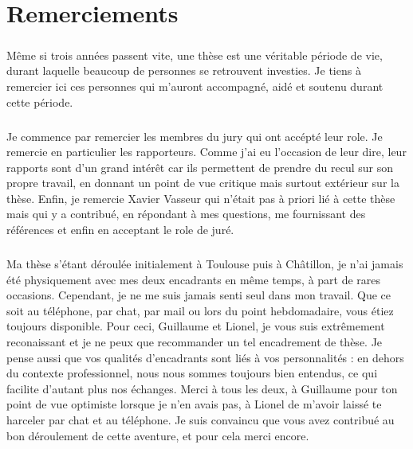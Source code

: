 \chapter{Remerciements}

  \paragraph{}
  Même si trois années passent vite, une thèse est une véritable période de vie, durant laquelle beaucoup de personnes se retrouvent investies.
  Je tiens à remercier ici ces personnes qui m'auront accompagné, aidé et soutenu durant cette période.

  \paragraph{}
  Je commence par remercier les membres du jury qui ont accépté leur role.
  Je remercie en particulier les rapporteurs.
  Comme j'ai eu l'occasion de leur dire, leur rapports sont d'un grand intérêt car ils permettent de prendre du recul sur son propre travail, en donnant un point de vue critique mais surtout extérieur sur la thèse.
  Enfin, je remercie Xavier Vasseur qui n'était pas à priori lié à cette thèse mais qui y a contribué, en répondant à mes questions, me fournissant des références et enfin en acceptant le role de juré.

  \paragraph{}
  Ma thèse s'étant déroulée initialement à Toulouse puis à Châtillon, je n'ai jamais été physiquement avec mes deux encadrants en même temps, à part de rares occasions.
  Cependant, je ne me suis jamais senti seul dans mon travail.
  Que ce soit au téléphone, par chat, par mail ou lors du point hebdomadaire, vous étiez toujours disponible.
  Pour ceci, Guillaume et Lionel, je vous suis extrêmement reconaissant et je ne peux que recommander un tel encadrement de thèse.
  Je pense aussi que vos qualités d'encadrants sont liés à vos personnalités : en dehors du contexte professionnel, nous nous sommes toujours bien entendus, ce qui facilite d'autant plus nos échanges.
  Merci à tous les deux, à Guillaume pour ton point de vue optimiste lorsque je n'en avais pas, à Lionel de m'avoir laissé te harceler par chat et au téléphone.
  Je suis convaincu que vous avez contribué au bon déroulement de cette aventure, et pour cela merci encore.

